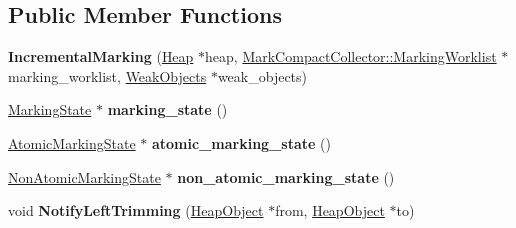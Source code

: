 \subsection*{Public Member Functions}
\begin{DoxyCompactItemize}
\item 
\mbox{\label{classv8_1_1internal_1_1IncrementalMarking_a020685ef0352d40d74811473f7b0f7b7}} 
{\bfseries Incremental\+Marking} (\mbox{\hyperlink{classv8_1_1internal_1_1Heap}{Heap}} $\ast$heap, \mbox{\hyperlink{classv8_1_1internal_1_1MarkCompactCollector_1_1MarkingWorklist}{Mark\+Compact\+Collector\+::\+Marking\+Worklist}} $\ast$marking\+\_\+worklist, \mbox{\hyperlink{structv8_1_1internal_1_1WeakObjects}{Weak\+Objects}} $\ast$weak\+\_\+objects)
\item 
\mbox{\label{classv8_1_1internal_1_1IncrementalMarking_af93d0386b989d72ab3eb007fc4e981ab}} 
\mbox{\hyperlink{classv8_1_1internal_1_1MajorNonAtomicMarkingState}{Marking\+State}} $\ast$ {\bfseries marking\+\_\+state} ()
\item 
\mbox{\label{classv8_1_1internal_1_1IncrementalMarking_a77a503508461725b10a003733616e4e2}} 
\mbox{\hyperlink{classv8_1_1internal_1_1MajorAtomicMarkingState}{Atomic\+Marking\+State}} $\ast$ {\bfseries atomic\+\_\+marking\+\_\+state} ()
\item 
\mbox{\label{classv8_1_1internal_1_1IncrementalMarking_a8c357c5423a5575c5e97cd3df832cea7}} 
\mbox{\hyperlink{classv8_1_1internal_1_1MajorNonAtomicMarkingState}{Non\+Atomic\+Marking\+State}} $\ast$ {\bfseries non\+\_\+atomic\+\_\+marking\+\_\+state} ()
\item 
\mbox{\label{classv8_1_1internal_1_1IncrementalMarking_a9c294c6c5958b713dc37459eb1776f38}} 
void {\bfseries Notify\+Left\+Trimming} (\mbox{\hyperlink{classv8_1_1internal_1_1HeapObject}{Heap\+Object}} $\ast$from, \mbox{\hyperlink{classv8_1_1internal_1_1HeapObject}{Heap\+Object}} $\ast$to)
\item 
\mbox{\label{classv8_1_1internal_1_1IncrementalMarking_aec0a9d0505e5c797176ccef463d7e9e8}} 

\end{DoxyCompactItemize}
